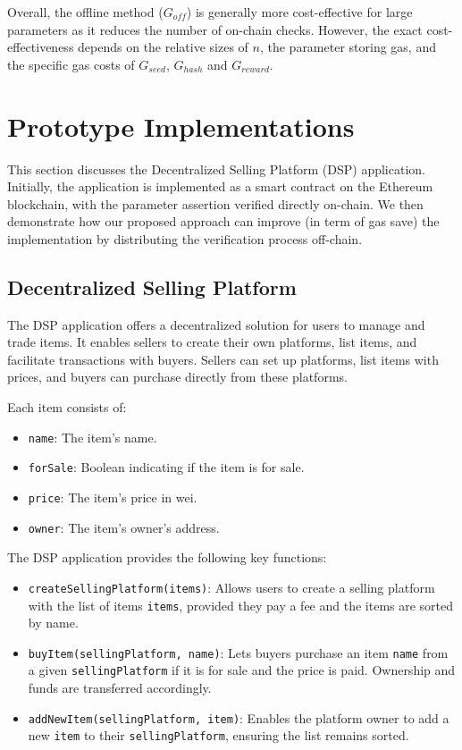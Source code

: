 \documentclass[runningheads]{llncs}
\begin{document}
Overall, the offline method (\( G_{off} \)) is generally more cost-effective for large parameters as it reduces the number of on-chain checks. However, the exact cost-effectiveness depends on the relative sizes of \( n \), the parameter storing gas, and the specific gas costs of \( G_{seed} \), \( G_{hash} \) and \( G_{reward} \).
\section{Prototype Implementations}
\label{sec:prototype-implementation}
This section discusses the Decentralized Selling Platform (DSP) application. Initially, the application is implemented as a smart contract on the Ethereum blockchain, with the parameter assertion verified directly on-chain. We then demonstrate how our proposed approach can improve (in term of gas save) the implementation by distributing the verification process off-chain.
\subsection{Decentralized Selling Platform}
The DSP application offers a decentralized solution for users to manage and trade items. It enables sellers to create their own platforms, list items, and facilitate transactions with buyers. Sellers can set up platforms, list items with prices, and buyers can purchase directly from these platforms.

Each item consists of:
\begin{itemize}
    \item \texttt{name}: The item's name.
    \item \texttt{forSale}: Boolean indicating if the item is for sale.
    \item \texttt{price}: The item's price in wei.
    \item \texttt{owner}: The item's owner's address.
\end{itemize}

The DSP application provides the following key functions:

\begin{itemize}
    \item \texttt{createSellingPlatform(items)}: Allows users to create a selling platform with the list of items \texttt{items}, provided they pay a fee and the items are sorted by name.
    \item \texttt{buyItem(sellingPlatform, name)}: Lets buyers purchase an item \texttt{name} from a given \texttt{sellingPlatform} if it is for sale and the price is paid. Ownership and funds are transferred accordingly.
    \item \texttt{addNewItem(sellingPlatform, item)}: Enables the platform owner to add a new \texttt{item} to their \texttt{sellingPlatform}, ensuring the list remains sorted.
\end{itemize}
\end{document}
